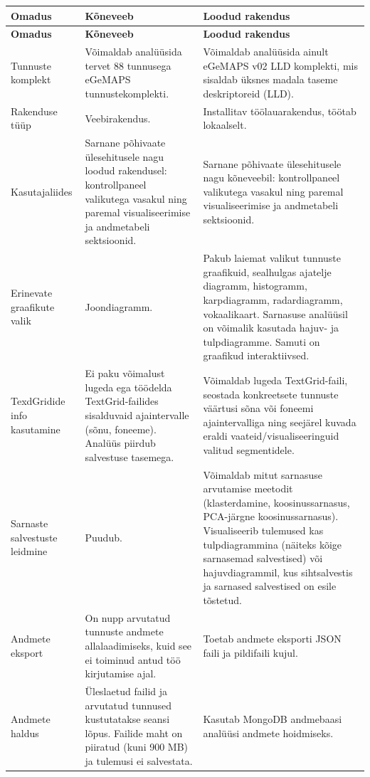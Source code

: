 \begin{longtable}{|p{2.5cm}|p{5.5cm}|p{5.5cm}|}
    \hline
    \textbf{Omadus} & \textbf{Kõneveeb} & \textbf{Loodud rakendus} \\
    \hline
    \endfirsthead
    \hline
    \textbf{Omadus} & \textbf{Kõneveeb} & \textbf{Loodud rakendus} \\
    \hline
    \endhead
    \hline
    \endfoot
    \hline
    \endlastfoot
    
    Tunnuste komplekt &
    Võimaldab analüüsida tervet 88 tunnusega eGeMAPS tunnustekomplekti. &
    Võimaldab analüüsida ainult eGeMAPS v02 LLD komplekti, mis sisaldab üksnes madala taseme deskriptoreid (LLD). \\
    \hline
    
    Rakenduse tüüp &
    Veebirakendus. &
    Installitav töölauarakendus, töötab lokaalselt. \\
    \hline
    
    Kasutajaliides &
    Sarnane põhivaate ülesehitusele nagu loodud rakendusel: kontrollpaneel valikutega vasakul ning paremal visualiseerimise ja andmetabeli sektsioonid. &
    Sarnane põhivaate ülesehitusele nagu kõneveebil: kontrollpaneel valikutega vasakul ning paremal visualiseerimise ja andmetabeli sektsioonid. \\
    \hline
    
    Erinevate graafikute valik &
    Joondiagramm. &
    Pakub laiemat valikut tunnuste graafikuid, sealhulgas ajatelje diagramm, histogramm, karpdiagramm, radardiagramm, vokaalikaart. Sarnasuse analüüsil on võimalik kasutada hajuv- ja tulpdiagramme. Samuti on graafikud interaktiivsed. \\
    \hline
    
    TexdGridide info kasutamine &
    Ei paku võimalust lugeda ega töödelda TextGrid-failides sisalduvaid ajaintervalle (sõnu, foneeme). Analüüs piirdub salvestuse tasemega. &
    Võimaldab lugeda TextGrid-faili, seostada konkreetsete tunnuste väärtusi sõna või foneemi ajaintervalliga ning seejärel kuvada eraldi vaateid/visualiseeringuid valitud segmentidele. \\
    \hline
    
    Sarnaste salvestuste leidmine &
    Puudub. &
    Võimaldab mitut sarnasuse arvutamise meetodit (klasterdamine, koosinussarnasus, PCA-järgne koosinussarnasus). Visualiseerib tulemused kas tulpdiagrammina (näiteks kõige sarnasemad salvestised) või hajuvdiagrammil, kus sihtsalvestis ja sarnased salvestised on esile tõstetud. \\
    \hline
    
    Andmete eksport &
    On nupp arvutatud tunnuste andmete allalaadimiseks, kuid see ei toiminud antud töö kirjutamise ajal. &
    Toetab andmete eksporti JSON faili ja pildifaili kujul. \\
    \hline
    
    Andmete haldus &
    Üleslaetud failid ja arvutatud tunnused kustutatakse seansi lõpus. Failide maht on piiratud (kuni 900 MB) ja tulemusi ei salvestata. &
    Kasutab MongoDB andmebaasi analüüsi andmete hoidmiseks. \\
    \hline

\end{longtable}

